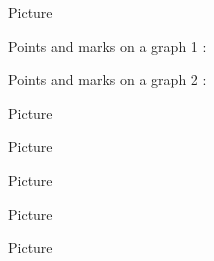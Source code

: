 
Picture 
\begin{center}

\end{center}


Points and marks on a graph 1 :

\begin{center}

\end{center}


Points and marks on a graph 2 :

\begin{center}

\end{center}


\begin{center}

\end{center}



Picture 
\begin{center}
   
\end{center}



Picture 
\begin{center}

\end{center}


Picture 
\begin{center}
   
\end{center}


Picture 
\begin{center}
   
\end{center}


Picture 
\begin{center}
   
\end{center}



